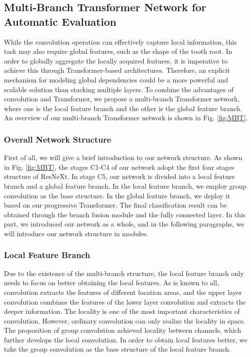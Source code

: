 \documentclass[journal]{IEEEtran}
\begin{document}
\subsection{Multi-Branch Transformer Network for Automatic Evaluation}

While the convolution operation can effectively capture local information, this task may also require global features, such as the shape of the tooth root. In order to globally aggregate the locally acquired features, it is imperative to achieve this through Transformer-based architectures. Therefore, an explicit mechanism for modeling global dependencies could be a more powerful and scalable solution than stacking multiple layers. To combine the advantages of convolution and Transformer, we propose a multi-branch Transformer network, where one is the local feature branch and the other is the global feature branch. An overview of our multi-branch Transformer network is shown in \textcolor[rgb]{0,0.541,0.855}{Fig. \ref{fig:MBT}}.

\subsubsection{Overall Network Structure}
First of all, we will give a brief introduction to our network structure. As shown in \textcolor[rgb]{0,0.541,0.855}{Fig. \ref{fig:MBT}}, the stages C1-C4 of our network adopt the first four stages structure of ResNeXt. In stage C5, our network is divided into a local feature branch and a global feature branch. In the local feature branch, we employ group convolution as the base structure. In the global feature branch, we deploy it based on our progressive Transformer. The final classification result can be obtained through the branch fusion module and the fully connected layer. In this part, we introduced our network as a whole, and in the following paragraphs, we will introduce our network structure in modules.


\subsubsection{Local Feature Branch}
Due to the existence of the multi-branch structure, the local feature branch only needs to focus on better obtaining the local features. As is known to all, convolution extracts the features of different location areas, and the upper layer convolution combines the features of the lower layer convolution and extracts the deeper information. The locality is one of the most important characteristics of convolution. However, ordinary convolution can only realize the locality in space. The proposition of group convolution achieved locality between channels, which further develops the local convolution. In order to obtain local features better, we take the group convolution as the base structure of the local feature branch.
\end{document}
